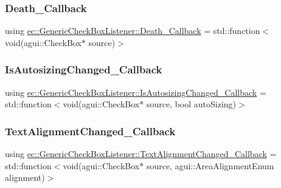 \subsubsection{\texorpdfstring{Death\+\_\+\+Callback}{Death\_Callback}}
{\footnotesize\ttfamily using \mbox{\hyperlink{classec_1_1_generic_check_box_listener_acd091665058b20651d26d5f43f9e3d3e}{ec\+::\+Generic\+Check\+Box\+Listener\+::\+Death\+\_\+\+Callback}} =  std\+::function$<$void(agui\+::\+Check\+Box$\ast$ source)$>$}

\mbox{\label{classec_1_1_generic_check_box_listener_ae1dcd4b36cbb45a5722b5146a62b0647}} 
\subsubsection{\texorpdfstring{Is\+Autosizing\+Changed\+\_\+\+Callback}{IsAutosizingChanged\_Callback}}
{\footnotesize\ttfamily using \mbox{\hyperlink{classec_1_1_generic_check_box_listener_ae1dcd4b36cbb45a5722b5146a62b0647}{ec\+::\+Generic\+Check\+Box\+Listener\+::\+Is\+Autosizing\+Changed\+\_\+\+Callback}} =  std\+::function$<$void(agui\+::\+Check\+Box$\ast$ source, bool auto\+Sizing)$>$}

\mbox{\label{classec_1_1_generic_check_box_listener_ab297fca8dea2b6edefe0c8d97c24c090}} 
\subsubsection{\texorpdfstring{Text\+Alignment\+Changed\+\_\+\+Callback}{TextAlignmentChanged\_Callback}}
{\footnotesize\ttfamily using \mbox{\hyperlink{classec_1_1_generic_check_box_listener_ab297fca8dea2b6edefe0c8d97c24c090}{ec\+::\+Generic\+Check\+Box\+Listener\+::\+Text\+Alignment\+Changed\+\_\+\+Callback}} =  std\+::function$<$void(agui\+::\+Check\+Box$\ast$ source, agui\+::\+Area\+Alignment\+Enum alignment)$>$}



